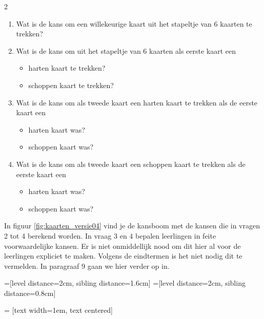 \begin{multicols}{2} %

\begin{enumerate}
    \item Wat is de kans om een willekeurige kaart uit het stapeltje van 6 kaarten te trekken?
    
\item Wat is de kans om uit het stapeltje van 6 kaarten als eerste kaart een 
\begin{itemize}
    \item harten kaart te trekken?
\item schoppen kaart te trekken?
\end{itemize}
\item Wat is de kans om als tweede kaart een harten kaart te trekken als de eerste kaart een
\begin{itemize}
    \item harten kaart was?
\item schoppen kaart was?
\end{itemize}
\item Wat is de kans om als tweede kaart een schoppen kaart te trekken als de eerste kaart een
\begin{itemize}
    \item harten kaart was?
\item schoppen kaart was?
\end{itemize}
\end{enumerate}




In figuur \autoref{fig:kaarten_versie04} vind je de kansboom met de kansen die in vragen 2 tot 4 berekend worden. In vraag 3 en 4 bepalen leerlingen in feite voorwaardelijke kansen. Er is niet onmiddellijk nood om dit hier al voor de leerlingen expliciet te maken. Volgens de eindtermen is het niet nodig dit te vermelden. In paragraaf 9 gaan we hier verder op in.
\begin{afbeeldingenv}
=[level distance=2cm, sibling distance=1.6cm]
=[level distance=2cm, sibling distance=0.8cm]

 = [text width=1em, text centered]


\end{afbeeldingenv}
\end{multicols}
